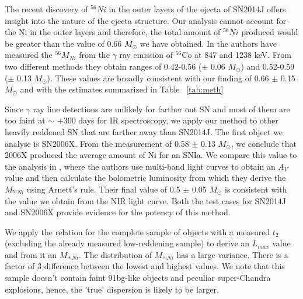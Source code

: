 The recent discovery of $^{56}Ni$ in the outer layers of the ejecta of SN2014J \citep{Diehl2014a} offers insight into the nature of the ejecta structure. Our analysis cannot account for the Ni in the outer layers and therefore, the total amount of ${^{56}Ni}$ produced would be greater than the value of 0.66  $M_{\odot}$ we have obtained. In \citep{Diehl2014b} the authors have measured the $^{56}M_{Ni}$ from the $\gamma$ ray emission of $^{56}$Co at 847 and 1238 keV. From two different methods they obtain ranges of 0.42-0.56 ($\pm$ 0.06 $M_{\odot}$) and 0.52-0.59 ($\pm$ 0.13 $M_{\odot}$). These values are broadly consistent with our finding of 0.66 $\pm$ 0.15 $M_{\odot}$ and with the estimates summarized in Table ~\ref{tab:meth}
 
Since $\gamma$ ray line detections are unlikely for farther out SN and most of them are too faint at $\sim$ +300 days for IR spectroscopy, we apply our method to other heavily reddened SN
that are farther away than SN2014J. The first object we analyse is SN2006X. From the measurement of 0.58 $\pm$ 0.13 $M_{\odot}$, we conclude that
2006X produced the average amount of Ni for an SNIa. We compare this value to the analysis in \citet{Wang2008}, where the authors use multi-band light curves to obtain an $A_V$ value and then calculate the bolometric luminosity from which they derive the $M_{^{56}Ni}$ using Arnett's rule. Their final value of 0.5 $\pm$ 0.05 $M_{\odot}$ is consistent with the value we obtain from the NIR light curve. 
Both the test cases for SN2014J and SN2006X provide evidence for the potency of this method. 

We apply the relation for the complete sample of objects with a measured $t_2$ (excluding the already measured low-reddening sample) to derive an $L_{max}$ value and from it an $M_{^{56}Ni}$. The distribution of $M_{^{56}Ni}$ has a large variance. There is a factor of 3 difference between the lowest and highest values. We note that this sample doesn't contain faint 91bg-like objects and peculiar super-Chandra explosions, hence, the 'true' dispersion is likely to be larger.  



